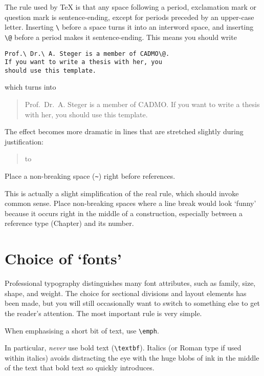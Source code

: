 The rule used by \TeX{} is that any space following a period,
exclamation mark or question mark is sentence-ending, except for
periods preceded by an upper-case letter.  Inserting \lstinline-\-
before a space turns it into an interword space, and inserting
\lstinline-\@- before a period makes it sentence-ending.  This means
you should write
\begin{lstlisting}
Prof.\ Dr.\ A. Steger is a member of CADMO\@.
If you want to write a thesis with her, you
should use this template.
\end{lstlisting}
which turns into
\begin{quote}
  Prof.\ Dr.\ A. Steger is a member of CADMO\@.  If you want to write
  a thesis with her, you should use this template.
\end{quote}
The effect becomes more dramatic in lines that are stretched slightly
during justification:
\begin{quote}
  \parbox{\linewidth}{\hbox to \linewidth{%
      Prof.\ Dr.\ A. Steger is a member of CADMO\@.  If you}}
\end{quote}

\begin{Rule}
  Place a non-breaking space (\lstinline-~-) right before references.
\end{Rule}

This is actually a slight simplification of the real rule, which
should invoke common sense.  Place non-breaking spaces where a line
break would look `funny' because it occurs right in the middle of a
construction, especially between a reference type (Chapter) and its
number.


\section{Choice of `fonts'}

Professional typography distinguishes many font attributes, such as
family, size, shape, and weight.  The choice for sectional divisions
and layout elements has been made, but you will still occasionally
want to switch to something else to get the reader's attention.  The
most important rule is very simple.

\begin{Rule}
  When emphasising a short bit of text, use \lstinline-\emph-.
\end{Rule}

In particular, \emph{never} use bold text (\lstinline-\textbf-).
Italics (or Roman type if used within italics) avoids distracting the
eye with the huge blobs of ink in the middle of the text that bold
text so quickly introduces.

